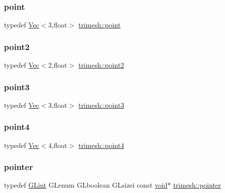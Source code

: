 \subsubsection{\texorpdfstring{point}{point}}
{\footnotesize\ttfamily typedef \hyperlink{classtrimesh_1_1Vec}{Vec}$<$3,float$>$ \hyperlink{namespacetrimesh_a325b99fd6454b22fa4c4bc3223271b2c}{trimesh\+::point}}

\mbox{\label{namespacetrimesh_aceeb924a83e13a21adecec58dcccfed8}} 
\subsubsection{\texorpdfstring{point2}{point2}}
{\footnotesize\ttfamily typedef \hyperlink{classtrimesh_1_1Vec}{Vec}$<$2,float$>$ \hyperlink{namespacetrimesh_aceeb924a83e13a21adecec58dcccfed8}{trimesh\+::point2}}

\mbox{\label{namespacetrimesh_acebb9713d8dfa7328e10196239ca5d4e}} 
\subsubsection{\texorpdfstring{point3}{point3}}
{\footnotesize\ttfamily typedef \hyperlink{classtrimesh_1_1Vec}{Vec}$<$3,float$>$ \hyperlink{namespacetrimesh_acebb9713d8dfa7328e10196239ca5d4e}{trimesh\+::point3}}

\mbox{\label{namespacetrimesh_a44139b182b9cc1d314b7bce240dc9678}} 
\subsubsection{\texorpdfstring{point4}{point4}}
{\footnotesize\ttfamily typedef \hyperlink{classtrimesh_1_1Vec}{Vec}$<$4,float$>$ \hyperlink{namespacetrimesh_a44139b182b9cc1d314b7bce240dc9678}{trimesh\+::point4}}

\mbox{\label{namespacetrimesh_a406a365150ad981ca5f6faf3f2ec5d91}} 
\subsubsection{\texorpdfstring{pointer}{pointer}}
{\footnotesize\ttfamily typedef \hyperlink{namespacetrimesh_aeccc290e30b317c861fb146956528187}{G\+Lint} G\+Lenum G\+Lboolean G\+Lsizei const \hyperlink{namespacetrimesh_a784ddfd979e1c579bda795a8edfc3f43}{void}$\ast$ \hyperlink{namespacetrimesh_a406a365150ad981ca5f6faf3f2ec5d91}{trimesh\+::pointer}}

